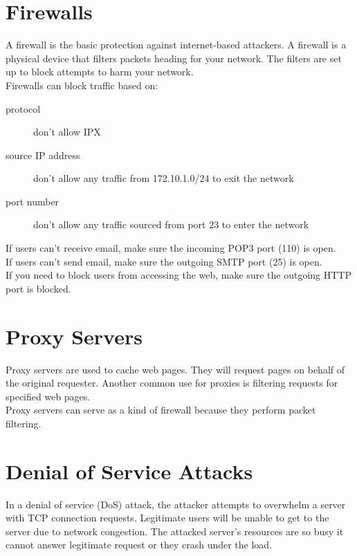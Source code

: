 \documentclass{article}
\begin{document}
\section{Firewalls}

A firewall is the basic protection against internet-based attackers. A
firewall is a physical device that filters packets heading for your network.
The filters are set up to block attempts to harm your network.\\

Firewalls can block traffic based on:

\begin{description}

\item[protocol]
don't allow IPX

\item[source IP address]
don't allow any traffic from 172.10.1.0/24 to exit the network

\item[port number]
don't allow any traffic sourced from port 23 to enter the network

\end{description}

If users can't receive email, make sure the incoming POP3 port (110) is open.\\

If users can't send email, make sure the outgoing SMTP port (25) is open.\\

If you need to block users from accessing the web, make sure the outgoing
HTTP port is blocked.

\section{Proxy Servers}

Proxy servers are used to cache web pages. They will request pages on behalf
of the original requester. Another common use for proxies is filtering
requests for specified web pages.\\

Proxy servers can serve as a kind of firewall because they perform packet
filtering.

\section{Denial of Service Attacks}

In a denial of service (DoS) attack, the attacker attempts to overwhelm a
server with TCP connection requests. Legitimate users will be unable to get to
the server due to network congestion. The attacked server's resources are so
busy it cannot answer legitimate request or they crash under the load.\\
\end{document}

